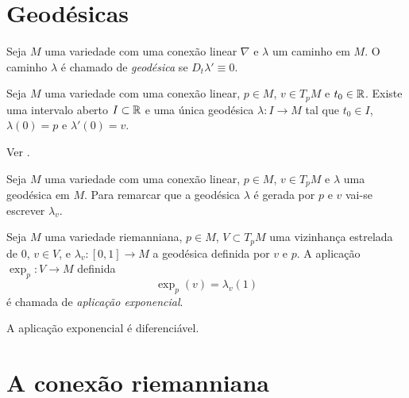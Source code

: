 \section{Geodésicas}

\begin{definicao}
	Seja $M$ uma variedade com uma conexão linear $\nabla$ e
	$\lambda$ um caminho em $M$.
	O caminho $\lambda$ é chamado de \emph{geodésica} se $D_t \lambda' \equiv 0$.
\end{definicao}

\begin{teorema}
	Seja $M$ uma variedade com uma conexão linear,
	$p \in M$,
	$v \in T_p M$ e
	$t_0 \in \mathbb R$.
	Existe uma intervalo aberto $I \subset \mathbb R$ e uma única geodésica $\lambda: I \rightarrow M$ tal que $t_0 \in I$,
	$\lambda(0) = p$ e
	$\lambda'(0) = v$.
\end{teorema}

\begin{demonstracao}
	Ver \cite[Theorem 4.10]{Lee1997}.
\end{demonstracao}

\begin{observacao}
	Seja $M$ uma variedade com uma conexão linear,
	$p \in M$,
	$v \in T_p M$ e
	$\lambda$ uma geodésica em $M$.
	Para remarcar que a geodésica $\lambda$ é gerada por $p$ e $v$ vai-se escrever $\lambda_v$.
\end{observacao}

\begin{definicao}
	Seja $M$ uma variedade riemanniana,
	$p \in M$,
	$V \subset T_p M$ uma vizinhança estrelada de 0,
	$v \in V$, e
	$\lambda_v: [0,1] \rightarrow M$ a geodésica definida por $v$ e $p$.
	A aplicação $\exp_p: V \rightarrow M$ definida
	\begin{equation*}
	\exp_p(v) = \lambda_v(1)
	\end{equation*}
	é chamada de \emph{aplicação exponencial}.
\end{definicao}

\begin{observacao}
	A aplicação exponencial é diferenciável.
\end{observacao}


\section{A conexão riemanniana}

